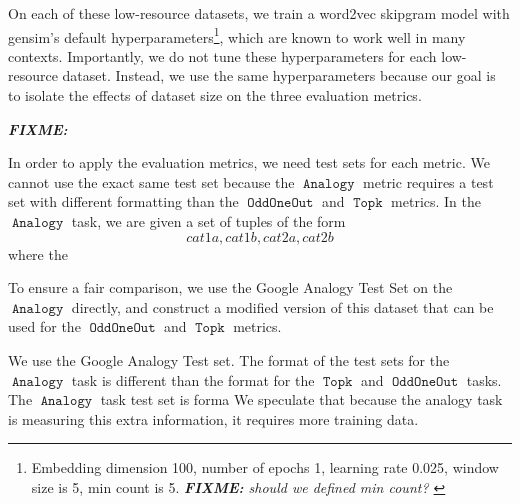 \documentclass[11pt,a4paper]{article}
\DeclareMathOperator{\OddOneOut}{\texttt{OddOneOut}}
\DeclareMathOperator{\topk}{\texttt{Topk}}
\DeclareMathOperator{\analogy}{\texttt{Analogy}}
\newcommand{\fixme}[1]{{\color{red}\itshape \textbf{FIXME:} {#1}}}
\begin{document}
On each of these low-resource datasets,
we train a word2vec skipgram model with gensim's default hyperparameters\footnote{
Embedding dimension 100, number of epochs 1, learning rate 0.025, window size is 5, min count is 5.
\fixme{
    should we defined min count?
}
},
which are known to work well in many contexts.
Importantly, we do not tune these hyperparameters for each low-resource dataset.
Instead, we use the same hyperparameters because our goal is to isolate the effects of dataset size on the three evaluation metrics.

\fixme{
In order to apply the evaluation metrics,
we need test sets for each metric.
We cannot use the exact same test set because the $\analogy$ metric requires a test set with different formatting than the $\OddOneOut$ and $\topk$ metrics.
In the $\analogy$ task, we are given a set of tuples of the form
\begin{equation*}
    cat1a,cat1b,cat2a,cat2b
\end{equation*}
where the

To ensure a fair comparison,
we use the Google Analogy Test Set on the $\analogy$ directly, 
and construct a modified version of this dataset that can be used for the $\OddOneOut$ and $\topk$ metrics.

We use the Google Analogy Test set.
The format of the test sets for the $\analogy$ task is different than the format for the $\topk$ and $\OddOneOut$ tasks.
The $\analogy$ task test set is forma
We speculate that because the analogy task is measuring this extra information,
it requires more training data.
}
\end{document}
